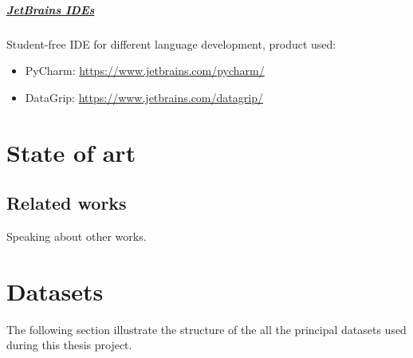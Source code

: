 \documentclass[%
    corpo=12pt,
    twoside,
    oldstyle,
    autoretitolo,
    greek,
    evenboxes,
]{toptesi}
\begin{document}
\paragraph{\href{https://www.jetbrains.com/}{JetBrains IDEs}} Student-free IDE for different language development, product used:
\begin{itemize}
  \item PyCharm: \url{https://www.jetbrains.com/pycharm/}
  \item DataGrip: \url{https://www.jetbrains.com/datagrip/}
\end{itemize}

\chapter{State of art}
\section{Related works}
Speaking about other works.


\chapter{Datasets}
\label{chap:dataset}
The following section illustrate the structure of the all the principal datasets used during this thesis project.
\end{document}
